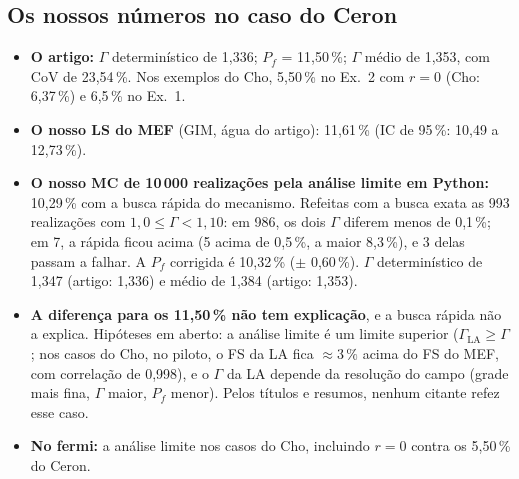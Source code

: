 \documentclass[11pt,a4paper]{article}
\begin{document}
\subsection{Os nossos números no caso do Ceron}\label{sec:ceronnum}
\begin{itemize}
  \item \textbf{O artigo:} $\Gamma$ determinístico de 1,336; $P_f$ = 11,50\,\%; $\Gamma$ médio de 1,353, com CoV de
    23,54\,\%. Nos exemplos do Cho, 5,50\,\% no Ex.~2 com $r = 0$ (Cho: 6,37\,\%) e 6,5\,\% no Ex.~1.
  \item \textbf{O nosso LS do MEF} (GIM, água do artigo): 11,61\,\% (IC de 95\,\%: 10,49 a 12,73\,\%).
  \item \textbf{O nosso MC de 10\,000 realizações pela análise limite em Python:} 10,29\,\% com a busca rápida do
    mecanismo. Refeitas com a busca exata as 993 realizações com $1{,}0 \le \Gamma < 1{,}10$: em 986, os dois $\Gamma$
    diferem menos de 0,1\,\%; em 7, a rápida ficou acima (5 acima de 0,5\,\%, a maior 8,3\,\%), e 3 delas passam a
    falhar. A $P_f$ corrigida é 10,32\,\% ($\pm$ 0,60\,\%). $\Gamma$ determinístico de 1,347 (artigo: 1,336) e médio de
    1,384 (artigo: 1,353).
  \item \textbf{A diferença para os 11,50\,\% não tem explicação}, e a busca rápida não a explica. Hipóteses em aberto:
    a análise limite é um limite superior ($\Gamma_\text{LA} \ge \Gamma$; nos casos do Cho, no piloto, o FS da LA fica
    $\approx 3\,\%$ acima do FS do MEF, com correlação de 0,998), e o $\Gamma$ da LA depende da resolução do campo
    (grade mais fina, $\Gamma$ maior, $P_f$ menor). Pelos títulos e resumos, nenhum citante refez esse caso.
  \item \textbf{No fermi:} a análise limite nos casos do Cho, incluindo $r = 0$ contra os 5,50\,\% do Ceron.
\end{itemize}

\end{document}
